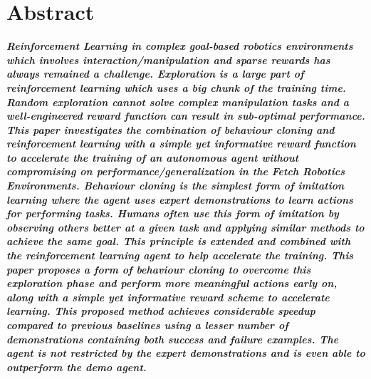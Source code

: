 \thispagestyle{acknowledgements}
\section*{Abstract}

\textbf{\textit{Reinforcement Learning in complex goal-based robotics environments which involves interaction/manipulation and sparse rewards has always remained a challenge. Exploration is a large part of reinforcement learning which uses a big chunk of the training time. Random exploration cannot solve complex manipulation tasks and a well-engineered reward function can result in sub-optimal performance. This paper investigates the combination of behaviour cloning and reinforcement learning with a simple yet informative reward function to accelerate the training of an autonomous agent without compromising on performance/generalization in the Fetch Robotics Environments. Behaviour cloning is the simplest form of imitation learning where the agent uses expert demonstrations to learn actions for performing tasks. Humans often use this form of imitation by observing others better at a given task and applying similar methods to achieve the same goal. This principle is extended and combined with the reinforcement learning agent to help accelerate the training. This paper proposes a form of behaviour cloning to overcome this exploration phase and perform more meaningful actions early on, along with a simple yet informative reward scheme to accelerate learning. This proposed method achieves considerable speedup compared to previous baselines using a lesser number of demonstrations containing both success and failure examples. The agent is not restricted by the expert demonstrations and is even able to outperform the demo agent.}}
